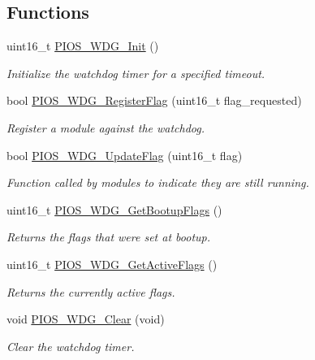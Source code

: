 \subsection*{\-Functions}
\begin{DoxyCompactItemize}
\item 
uint16\-\_\-t \hyperlink{group___p_i_o_s___w_d_g_ga1ffcba6811cce798c0a6bc014a691dc7}{\-P\-I\-O\-S\-\_\-\-W\-D\-G\-\_\-\-Init} ()
\begin{DoxyCompactList}\small\item\em \-Initialize the watchdog timer for a specified timeout. \end{DoxyCompactList}\item 
bool \hyperlink{group___p_i_o_s___w_d_g_ga181128f13ffdec27ea07e13fc4a4e1ab}{\-P\-I\-O\-S\-\_\-\-W\-D\-G\-\_\-\-Register\-Flag} (uint16\-\_\-t flag\-\_\-requested)
\begin{DoxyCompactList}\small\item\em \-Register a module against the watchdog. \end{DoxyCompactList}\item 
bool \hyperlink{group___p_i_o_s___w_d_g_ga4698d93015624e320b5c7c980c4edecd}{\-P\-I\-O\-S\-\_\-\-W\-D\-G\-\_\-\-Update\-Flag} (uint16\-\_\-t flag)
\begin{DoxyCompactList}\small\item\em \-Function called by modules to indicate they are still running. \end{DoxyCompactList}\item 
uint16\-\_\-t \hyperlink{group___p_i_o_s___w_d_g_ga0cb157cf1f3763126ab097d9bf67658b}{\-P\-I\-O\-S\-\_\-\-W\-D\-G\-\_\-\-Get\-Bootup\-Flags} ()
\begin{DoxyCompactList}\small\item\em \-Returns the flags that were set at bootup. \end{DoxyCompactList}\item 
uint16\-\_\-t \hyperlink{group___p_i_o_s___w_d_g_ga725a2e6282c5cb3c63d5c022204aec22}{\-P\-I\-O\-S\-\_\-\-W\-D\-G\-\_\-\-Get\-Active\-Flags} ()
\begin{DoxyCompactList}\small\item\em \-Returns the currently active flags. \end{DoxyCompactList}\item 
void \hyperlink{group___p_i_o_s___w_d_g_ga49f0e0259a9db3551d437e5d74fd48a1}{\-P\-I\-O\-S\-\_\-\-W\-D\-G\-\_\-\-Clear} (void)
\begin{DoxyCompactList}\small\item\em \-Clear the watchdog timer. \end{DoxyCompactList}\end{DoxyCompactItemize}
